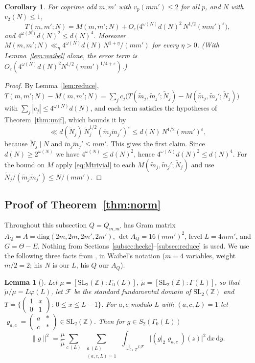 \documentclass[11pt]{amsart}
\newtheorem{lemma}[theorem]{Lemma}
\newtheorem{corollary}[theorem]{Corollary}
\theoremstyle{remark}
\newcommand{\Z}{\mathbb{Z}}
\newcommand{\cF}{\mathcal{F}}
\newcommand{\e}{\varepsilon}
\newcommand{\dd}{\mathrm{d}}
\begin{document}
\begin{corollary}\label{cor:unif}
For coprime odd $m,m'$ with $v_p(mm')\le2$ for all $p$, and $N$ with $v_2(N)\le1$,
\[
T(m,m';N)=M(m,m';N)+O_\e\bigl(4^{\omega(N)}d(N)^2\,N^{1/2}(mm')^{\e}\bigr),
\]
and $4^{\omega(N)}d(N)^2\le d(N)^{4}$. Moreover $M(m,m';N)\ll_\eta 4^{\omega(N)}d(N)\,N^{1+\eta}/(mm')$ for every $\eta>0$. (With Lemma~\ref{lem:waibel} alone, the error term is $O_\e(4^{\omega(N)}d(N)^2N^{1/2}(mm')^{1/4+\e})$.)
\end{corollary}
\begin{proof}
By Lemma~\ref{lem:reduce}, $T(m,m';N)-M(m,m';N)=\sum_jc_j\bigl(T(\tilde m_j,\tilde m_j';\tilde N_j)-M(\tilde m_j,\tilde m_j';\tilde N_j)\bigr)$ with $\sum_j|c_j|\le4^{\omega(N)}d(N)$, and each term satisfies the hypotheses of Theorem~\ref{thm:unif}, which bounds it by
\[
\ll d(\tilde N_j)\,\tilde N_j^{1/2}(\tilde m_j\tilde m_j')^{\e}\le d(N)\,N^{1/2}(mm')^{\e},
\]
because $\tilde N_j\mid N$ and $\tilde m_j\tilde m_j'\le mm'$. This gives the first claim. Since $d(N)\ge2^{\omega(N)}$ we have $4^{\omega(N)}\le d(N)^2$, hence $4^{\omega(N)}d(N)^2\le d(N)^4$. For the bound on $M$ apply \eqref{eq:Mtrivial} to each $M(\tilde m_j,\tilde m_j';\tilde N_j)$ and use $\tilde N_j/(\tilde m_j\tilde m_j')\le N/(mm')$.
\end{proof}

\subsection{Proof of Theorem~\ref{thm:norm}}\label{subsec:norm}
Throughout this subsection $Q=Q_{m,m'}$ has Gram matrix $A_Q=A=\mathrm{diag}(2m,2m,2m',2m')$, $\det A_Q=16(mm')^2$, level $L=4mm'$, and $G=\Theta-E$. Nothing from Sections~\ref{subsec:hecke}--\ref{subsec:reduce} is used. We use the following three facts from \cite{Waibel}, in Waibel's notation ($m=4$ variables, weight $m/2=2$; his $N$ is our $L$, his $Q$ our $A_Q$).

\begin{lemma}[{\cite[(22)]{Waibel}}]\label{lem:W1}
Let $\mu=[\mathrm{SL}_2(\Z):\Gamma_0(L)]$, $\tilde\mu=[\mathrm{SL}_2(\Z):\Gamma(L)]$, so that $\tilde\mu/\mu=L\varphi(L)$, let $\cF$ be the standard fundamental domain of $\mathrm{SL}_2(\Z)$ and $T=\{\left(\begin{smallmatrix}1&x\\ 0&1\end{smallmatrix}\right):\ 0\le x\le L-1\}$. For $a,c$ modulo $L$ with $(a,c,L)=1$ let $\varrho_{a,c}=\left(\begin{smallmatrix}a&*\\ c&*\end{smallmatrix}\right)\in\mathrm{SL}_2(\Z)$. Then for $g\in S_2(\Gamma_0(L))$
\[
\|g\|^2=\frac{\mu}{\tilde\mu}\sum_{c\ (L)}\ \sum_{\substack{a\ (L)\\ (a,c,L)=1}}\ \int_{\bigcup_{t\in T}t\cF}\bigl|(g|_2\varrho_{a,c})(z)\bigr|^2\,\dd x\,\dd y .
\]
\end{lemma}
\end{document}
